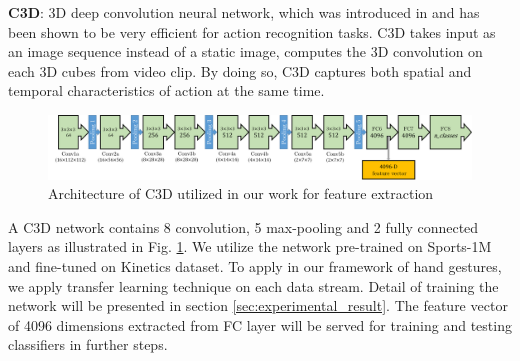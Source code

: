    \textbf{C3D}: 3D deep convolution neural network, which was introduced in \cite{tran2015learning} and has been shown to be very efficient for action recognition tasks. C3D takes input as an image sequence instead of a static image, computes the 3D convolution on each 3D cubes from video clip. By doing so, C3D captures both spatial and temporal characteristics of action at the same time.
    \begin{figure}[htbp]
        \centering
        \includegraphics[width=1\linewidth]{Figs/C3D.png}
        \caption{Architecture of C3D utilized in our work for feature extraction}
        \label{fig:C3D}
    \end{figure}
    A C3D network contains 8 convolution, 5 max-pooling and 2 fully connected layers as illustrated in Fig. \ref{fig:C3D}. 
    We utilize the network pre-trained on Sports-1M and fine-tuned on Kinetics dataset. To apply in our framework of hand gestures, we apply transfer learning technique on each data stream. Detail of training the network will be presented in section \ref{sec:experimental_result}. The feature vector of 4096 dimensions extracted from FC layer will be served for training and testing classifiers in further steps.
